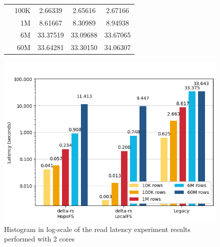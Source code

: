 \begin{figure}
\begin{minipage}[b]{\textwidth}
\begin{tabular}{c r S[table-format=5.5] S[table-format=5.5] S[table-format=5.5]}
                                      & 100K &     2.66339 &    2.65616 &    2.67166\\ 
                                      & 1M   &     8.61667 &    8.30989 &    8.94938\\
                                      & 6M   &    33.37519 &   33.09688 &   33.67065\\
                                      & 60M  &    33.64281 &   33.30150 &   34.06307\\
            \bottomrule
        \end{tabular}
    \end{minipage}
    \begin{minipage}[b]{\textwidth}
        \centering
        \includegraphics[width=\textwidth]{figures/99-appendix/results-diagrams/read/read_time_2_core.png}
        \caption{Histogram in log-scale of the read latency experiment results performed with 2  cores}
        \label{fig:appx_res_read_time_2_cores}
    \end{minipage}
\end{figure}

